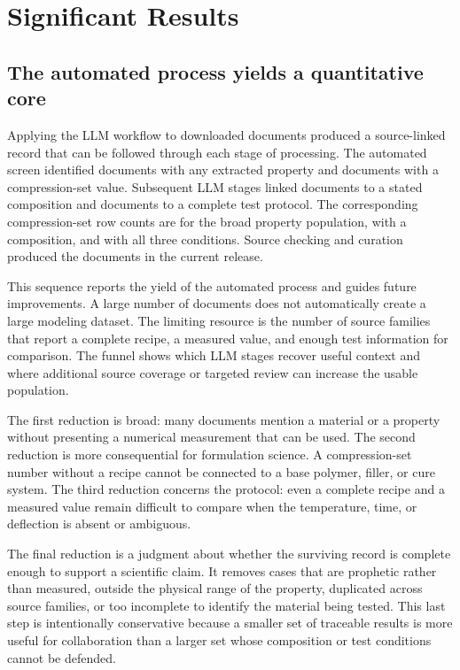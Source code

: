 \documentclass[10pt]{article}
\begin{document}
\section{Significant Results}
\subsection{The automated process yields a quantitative core}
Applying the LLM workflow to \nCorpusDocs{} downloaded documents produced a
source-linked record that can be followed through each stage of processing.
The automated screen identified \nPropDocs{} documents with any extracted
property and \nCsDocs{} documents with a compression-set value. Subsequent
LLM stages linked \nCsCompDocs{} documents to a stated composition and
\nCsCondDocs{} documents to a complete test protocol. The corresponding
compression-set row counts are \nCsRows{} for the broad property population,
\nCsCompRows{} with a composition, and \nCsCondRows{} with all three
conditions. Source checking and curation produced the \nRelDocs{} documents in
the current release.

This sequence reports the yield of the automated process and guides future
improvements. A large number of documents does not automatically create a
large modeling dataset. The limiting resource is the number of source families
that report a complete recipe, a measured value, and enough test information
for comparison. The funnel shows which LLM stages recover useful context and
where additional source coverage or targeted review can increase the usable
population.

The first reduction is broad: many documents mention a material or a property
without presenting a numerical measurement that can be used. The second
reduction is more consequential for formulation science. A compression-set
number without a recipe cannot be connected to a base polymer, filler, or cure
system. The third reduction concerns the protocol: even a complete recipe and a
measured value remain difficult to compare when the temperature, time, or
deflection is absent or ambiguous.

The final reduction is a judgment about whether the surviving record is
complete enough to support a scientific claim. It removes cases that are
prophetic rather than measured, outside the physical range of the property,
duplicated across source families, or too incomplete to identify the material
being tested. This last step is intentionally conservative because a smaller
set of traceable results is more useful for collaboration than a larger set
whose composition or test conditions cannot be defended.
\end{document}
